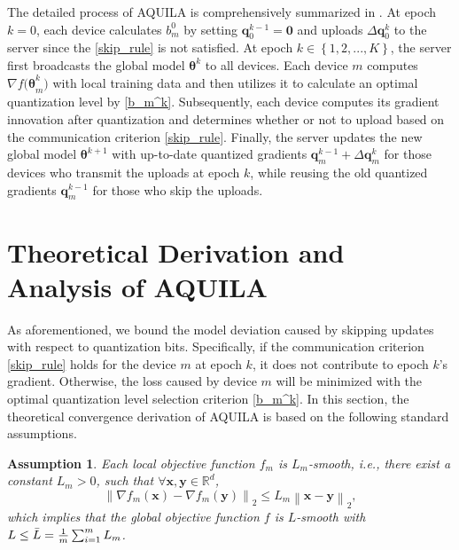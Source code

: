 \documentclass[lettersize,journal]{IEEEtran}
\newtheorem{assumption}{Assumption}
\begin{document}
The detailed process of AQUILA is comprehensively summarized in . At epoch $k=0$, each device calculates $b_m^0$ by setting $\boldsymbol{q}_0^{k - 1} = \boldsymbol{0}$ and uploads $\Delta \boldsymbol{q}_0^k$ to the server since the \eqref{skip_rule} is not satisfied. At epoch $k \in \left\{1, 2, ..., K\right\}$, the server first broadcasts the global model $\boldsymbol{\boldsymbol{\theta}} ^{k}$ to all devices. Each device $m$ computes ${\nabla f (\boldsymbol{\theta}}_{m}^{k})$ with local training data and then utilizes it to calculate an optimal quantization level by \eqref{b_m^k}. Subsequently, each device computes its gradient innovation after quantization and determines whether or not to upload based on the communication criterion \eqref{skip_rule}. Finally, the server updates the new global model $\boldsymbol{\boldsymbol{\theta}} ^{k+1}$ with up-to-date quantized gradients $\boldsymbol{q}_{m}^{k-1} + \Delta \boldsymbol{q}_{m}^{k}$ for those devices who transmit the uploads at epoch $k$, while reusing the old quantized gradients $\boldsymbol{q}_{m}^{k-1}$ for those who skip the uploads.


\section{Theoretical Derivation and Analysis of AQUILA}
\label{development}
As aforementioned, we bound the model deviation caused by skipping updates with respect to quantization bits. Specifically, if the communication criterion \eqref{skip_rule} holds for the device $m$ at epoch $k$, it does not contribute to epoch $k$'s gradient. Otherwise, the loss caused by device $m$ will be minimized with the optimal quantization level selection criterion \eqref{b_m^k}. In this section, the theoretical convergence derivation of AQUILA is based on the following standard assumptions.

\begin{assumption}
\textit{
Each local objective function $f_{m}$ is $L_{m}$-smooth, i.e., there exist a constant $L_m > 0$, such that $\forall \boldsymbol{x}, \boldsymbol{y} \in \mathbb{R}^d$,}
\begin{equation}
\left\|\nabla f_m(\mathbf{x})-\nabla f_m(\mathbf{y})\right\|_2\leqslant L_m\left\| \mathbf{x}-\mathbf{y} \right\|_2,
\end{equation}
which implies that the global objective function $f$ is $L$-smooth with $L \leq \Bar{L} = \frac{1}{m}\sum_{i = 1}^m L_m$.
\end{assumption}
\end{document}
